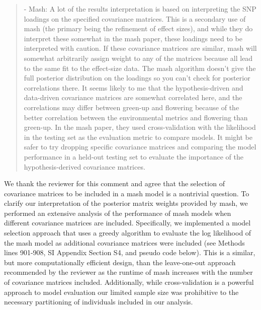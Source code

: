 \documentclass[
  letterpaper,
  DIV=11,
  numbers=noendperiod]{scrartcl}
\begin{document}
\begin{quote}
\begin{tcolorbox}[enhanced jigsaw, rightrule=.15mm, colframe=quarto-callout-warning-color-frame, leftrule=.75mm, arc=.35mm, colback=white, opacityback=0, left=2mm, breakable, toprule=.15mm, bottomrule=.15mm]

- Mash: A lot of the results interpretation is based on interpreting the
SNP loadings on the specified covariance matrices. This is a secondary
use of mash (the primary being the refinement of effect sizes), and
while they do interpret these somewhat in the mash paper, these loadings
need to be interpreted with caution. If these covariance matrices are
similar, mash will somewhat arbitrarily assign weight to any of the
matrices because all lead to the same fit to the effect-size data. The
mash algorithm doesn't give the full posterior distribution on the
loadings so you can't check for posterior correlations there. It seems
likely to me that the hypothesis-driven and data-driven covariance
matrices are somewhat correlated here, and the correlations may differ
between green-up and flowering because of the better correlation between
the environmental metrics and flowering than green-up. In the mash
paper, they used cross-validation with the likelihood in the testing set
as the evaluation metric to compare models. It might be safer to try
dropping specific covariance matrices and comparing the model
performance in a held-out testing set to evaluate the importance of the
hypothesis-derived covariance matrices.

\end{tcolorbox}
\end{quote}

We thank the reviewer for this comment and agree that the selection of
covariance matrices to be included in a mash model is a nontrivial
question. To clarify our interpretation of the posterior matrix weights
provided by mash, we performed an extensive analysis of the performance
of mash models when different covariance matrices are included.
Specifically, we implemented a model selection approach that uses a
greedy algorithm to evaluate the log likelihood of the mash model as
additional covariance matrices were included (see Methods lines 901-908,
SI Appendix Section S4, and pseudo code below). This is a similar, but
more computationally efficient design, than the leave-one-out approach
recommended by the reviewer as the runtime of mash increases with the
number of covariance matrices included. Additionally, while
cross-validation is a powerful approach to model evaluation our limited
sample size was prohibitive to the necessary partitioning of individuals
included in our analysis.
\end{document}
